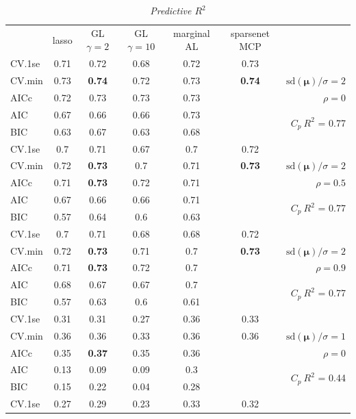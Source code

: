 \documentclass[12pt]{article}
\newcommand{\mr}[1]{\mathrm{#1}}
\newcommand{\bm}[1]{\mathbf{#1}}
\begin{document}
\begin{table}[p]\vspace{-.5cm}
\caption[l]{\label{r2}\it Predictive $R^2$\hfill}
\vspace{-.5cm}
\small{}
\begin{center}
\begin{tabular}{l*{5}{c}|r}
 & lasso & GL $\gamma=2$ & GL $\gamma=10$ & marginal AL & sparsenet MCP  &  \\
\cline{1-7}
CV.1se & 0.71 & 0.72 & 0.68 & 0.72 & 0.73 &\\
CV.min & 0.73 & {\bf 0.74} & 0.72 & 0.73 & {\bf 0.74} &  $\mr{sd}(\bm{\mu})/\sigma=2$ \\
AICc & 0.72 & 0.73 & 0.73 & 0.73 & & $\rho=0$ \\
AIC & 0.67 & 0.66 & 0.66 & 0.73 & & \multirow{2}{*}{$C_p ~ R^2$ = 0.77} \\
BIC & 0.63 & 0.67 & 0.63 & 0.68 & & \\
 \hline 
CV.1se & 0.7 & 0.71 & 0.67 & 0.7 & 0.72 &\\
CV.min & 0.72 & {\bf 0.73} & 0.7 & 0.71 & {\bf 0.73} &  $\mr{sd}(\bm{\mu})/\sigma=2$ \\
AICc & 0.71 & {\bf 0.73} & 0.72 & 0.71 & & $\rho=0.5$ \\
AIC & 0.67 & 0.66 & 0.66 & 0.71 & & \multirow{2}{*}{$C_p ~ R^2$ = 0.77} \\
BIC & 0.57 & 0.64 & 0.6 & 0.63 & & \\
 \hline 
CV.1se & 0.7 & 0.71 & 0.68 & 0.68 & 0.72 &\\
CV.min & 0.72 & {\bf 0.73} & 0.71 & 0.7 & {\bf 0.73} &  $\mr{sd}(\bm{\mu})/\sigma=2$ \\
AICc & 0.71 & {\bf 0.73} & 0.72 & 0.7 & & $\rho=0.9$ \\
AIC & 0.68 & 0.67 & 0.67 & 0.7 & & \multirow{2}{*}{$C_p ~ R^2$ = 0.77} \\
BIC & 0.57 & 0.63 & 0.6 & 0.61 & & \\
 \hline 
CV.1se & 0.31 & 0.31 & 0.27 & 0.36 & 0.33 &\\
CV.min & 0.36 & 0.36 & 0.33 & 0.36 & 0.36 &  $\mr{sd}(\bm{\mu})/\sigma=1$ \\
AICc & 0.35 & {\bf 0.37} & 0.35 & 0.36 & & $\rho=0$ \\
AIC & 0.13 & 0.09 & 0.09 & 0.3 & & \multirow{2}{*}{$C_p ~ R^2$ = 0.44} \\
BIC & 0.15 & 0.22 & 0.04 & 0.28 & & \\
 \hline 
CV.1se & 0.27 & 0.29 & 0.23 & 0.33 & 0.32 &\\

\end{tabular}
\end{center}
\end{table}
\end{document}
